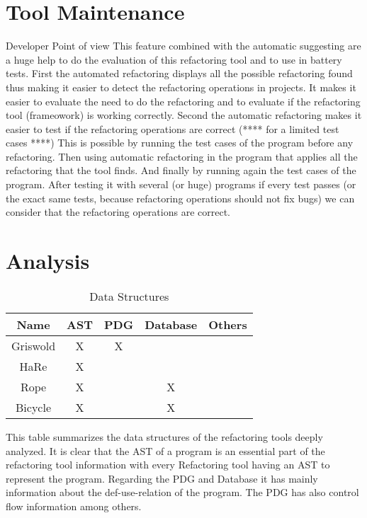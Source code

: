

\section{Tool Maintenance}
Developer Point of view
This feature combined with the automatic suggesting are a huge help to do the
evaluation of this refactoring tool and to use in battery tests.
First the automated refactoring displays all the possible refactoring found thus making it easier
to detect the refactoring operations in projects.
It makes it easier to evaluate the need to do the refactoring and to evaluate
if the refactoring tool (frameowork) is working correctly.
Second the automatic refactoring makes it easier to test if the refactoring operations are correct (**** for a limited test cases ****)
This is possible by running the test cases of the program before any refactoring.
Then using automatic refactoring in the program that applies all the refactoring that the tool finds.
And finally by running again the test cases of the program.
After testing it with several (or huge) programs if every test passes (or the exact same tests, because refactoring operations should not fix bugs)
we can consider that the refactoring operations are correct.


\section{Analysis}
\begin{table}[]
\centering
\caption{Data Structures}
\label{my-label}
\begin{tabular}{c|c|c|c|c}
Name     & AST & PDG & Database & Others \\ \hline
Griswold & X   & X   &          &        \\ \hline
HaRe     & X   &     &          &        \\ \hline
Rope     & X   &     & X        &        \\ \hline
Bicycle  & X   &     & X        &
\end{tabular}
\end{table}
This table summarizes the data structures of the refactoring tools deeply analyzed.
It is clear that the AST of a program is an essential part of the refactoring
tool information with every Refactoring tool having an AST to represent the program.
Regarding the PDG and Database it has mainly information about the def-use-relation
of the program. The PDG has also control flow information among others.

